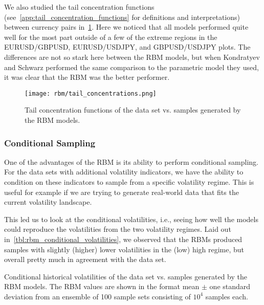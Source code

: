 We also studied the tail concentration functions (see~\cref{app:tail_concentration_functions} for definitions and interpretations) between currency pairs in~\cref{fig:rbm_tail_concentrations}.
Here we noticed that all models performed quite well for the most part outside of a few of the extreme regions in the EURUSD/GBPUSD, EURUSD/USDJPY, and GBPUSD/USDJPY plots.
The differences are not so stark here between the RBM models, but when Kondratyev and Schwarz performed the same comparison to the parametric model they used, it was clear that the RBM was the better performer.
\begin{figure}[!htb]
    \begin{center}
        \texttt{[image: rbm/tail\_concentrations.png]}
    \end{center}
    \caption{Tail concentration functions of the data set vs. samples generated by the RBM models.}
    \label{fig:rbm_tail_concentrations}
\end{figure}

\subsubsection{Conditional Sampling}
One of the advantages of the RBM is its ability to perform conditional sampling.
For the data sets with additional volatility indicators, we have the ability to condition on these indicators to sample from a specific volatility regime.
This is useful for example if we are trying to generate real-world data that fits the current volatility landscape.

This led us to look at the conditional volatilities, i.e., seeing how well the models could reproduce the volatilities from the two volatility regimes.
Laid out in~\cref{tbl:rbm_conditional_volatilities}, we observed that the RBMs produced samples with slightly (higher) lower volatilities in the (low) high regime, but overall pretty much in agreement with the data set.
\begin{table}[!htb]
    \centering
    \begin{adjustbox}{max width=\textwidth}
        
    \end{adjustbox}
    \caption{Conditional historical volatilities of the data set vs. samples generated by the RBM models. The RBM values are shown in the format mean \(\pm\) one standard deviation from an ensemble of 100 sample sets consisting of \( 10^4 \) samples each.}
    \label{tbl:rbm_conditional_volatilities}
\end{table}

